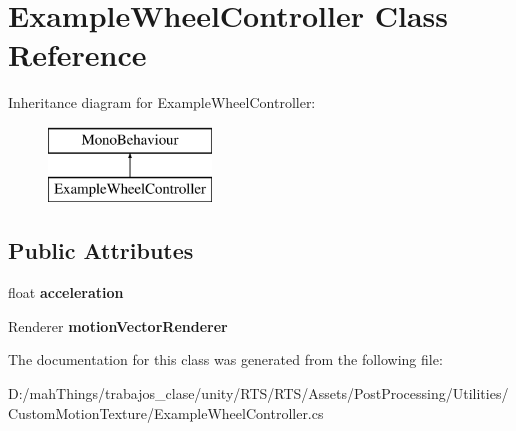 \hypertarget{class_example_wheel_controller}{}\section{Example\+Wheel\+Controller Class Reference}
\label{class_example_wheel_controller}
Inheritance diagram for Example\+Wheel\+Controller\+:\begin{figure}[H]
\begin{center}
\leavevmode
\includegraphics[height=2.000000cm]{class_example_wheel_controller}
\end{center}
\end{figure}
\subsection*{Public Attributes}
\begin{DoxyCompactItemize}
\item 
\mbox{\label{class_example_wheel_controller_a4da6bd05730ce6b82fbf340e1edd6c58}} 
float {\bfseries acceleration}
\item 
\mbox{\label{class_example_wheel_controller_ae7f3dc107a18fda83dff42269da86c00}} 
Renderer {\bfseries motion\+Vector\+Renderer}
\end{DoxyCompactItemize}


The documentation for this class was generated from the following file\+:\begin{DoxyCompactItemize}
\item 
D\+:/mah\+Things/trabajos\+\_\+clase/unity/\+R\+T\+S/\+R\+T\+S/\+Assets/\+Post\+Processing/\+Utilities/\+Custom\+Motion\+Texture/Example\+Wheel\+Controller.\+cs\end{DoxyCompactItemize}
